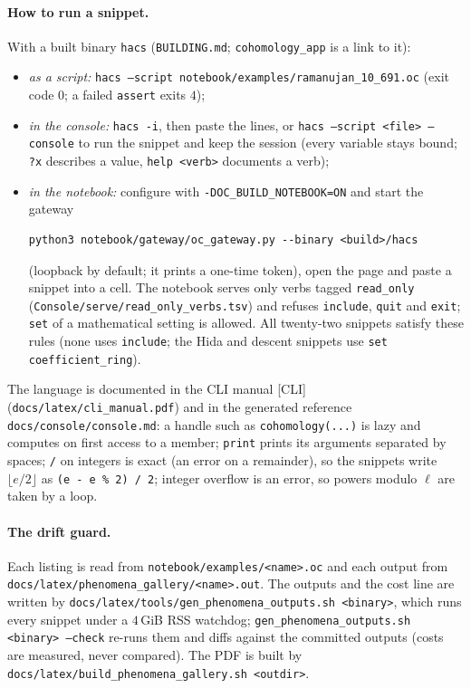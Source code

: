 \documentclass[11pt]{article}
\newcommand{\code}[1]{\texttt{#1}}
\newcommand{\file}[1]{\texttt{#1}}
\begin{document}
\paragraph{How to run a snippet.} With a built binary \file{hacs} (\file{BUILDING.md}; \file{cohomology\_app} is a link to it):
\begin{itemize}[leftmargin=1.6em]
\item \emph{as a script:} \code{hacs --script notebook/examples/ramanujan\_10\_691.oc} (exit code $0$; a failed
  \code{assert} exits $4$);
\item \emph{in the console:} \code{hacs -i}, then paste the lines, or \code{hacs --script <file> --console} to run
  the snippet and keep the session (every variable stays bound; \code{?x} describes a value, \code{help <verb>} documents a verb);
\item \emph{in the notebook:} configure with \code{-DOC\_BUILD\_NOTEBOOK=ON} and start the gateway
\begin{Verbatim}[fontsize=\small]
python3 notebook/gateway/oc_gateway.py --binary <build>/hacs
\end{Verbatim}
  (loopback by default; it prints a one-time token), open the page and paste a snippet into a cell. The notebook serves only verbs tagged \code{read\_only}
  (\file{Console/serve/read\_only\_verbs.tsv}) and refuses \code{include}, \code{quit} and \code{exit}; \code{set} of a mathematical
  setting is allowed. All twenty-two snippets satisfy these rules (none uses \code{include}; the Hida and descent snippets use \code{set coefficient\_ring}).
\end{itemize}
The language is documented in the CLI manual [CLI] (\file{docs/latex/cli\_manual.pdf}) and in the generated reference
\file{docs/console/console.md}: a handle such as \code{cohomology(...)} is lazy and computes on first access to a member; \code{print}
prints its arguments separated by spaces; \code{/} on integers is exact (an error on a remainder), so the snippets write $\lfloor e/2\rfloor$
as \code{(e - e \% 2) / 2}; integer overflow is an error, so powers modulo $\ell$ are taken by a loop.

\paragraph{The drift guard.} Each listing is read from \file{notebook/examples/<name>.oc} and each output from
\file{docs/latex/phenomena\_gallery/<name>.out}. The outputs and the cost line are written by
\file{docs/latex/tools/gen\_phenomena\_outputs.sh <binary>}, which runs every snippet under a $4$\,GiB RSS watchdog;
\code{gen\_phenomena\_outputs.sh <binary> --check} re-runs them and diffs against the committed outputs (costs are measured, never compared).
The PDF is built by \file{docs/latex/build\_phenomena\_gallery.sh <outdir>}.
\end{document}

